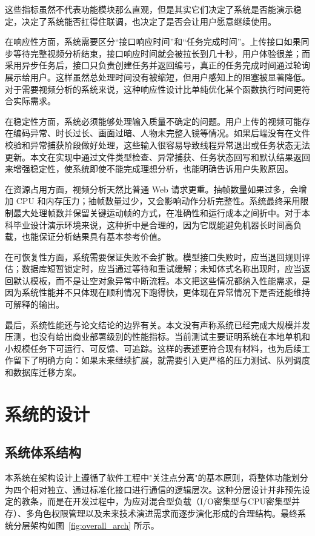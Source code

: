 这些指标虽然不代表功能模块那么直观，但是其实它们决定了系统是否能演示稳定，决定了系统能否扛得住联调，也决定了是否会让用户愿意继续使用。

在响应性方面，系统需要区分“接口响应时间”和“任务完成时间”。上传接口如果同步等待完整视频分析结束，接口响应时间就会被拉长到几十秒，用户体验很差；而采用异步任务后，接口只负责创建任务并返回编号，真正的任务完成时间通过轮询展示给用户。这样虽然总处理时间没有被缩短，但用户感知上的阻塞被显著降低。对于需要视频分析的系统来说，这种响应性设计比单纯优化某个函数执行时间更符合实际需求。

在稳定性方面，系统必须能够处理输入质量不确定的问题。用户上传的视频可能存在编码异常、时长过长、画面过暗、人物未完整入镜等情况。如果后端没有在文件校验和异常捕获阶段做好处理，这些输入很容易导致线程异常退出或任务状态无法更新。本文在实现中通过文件类型检查、异常捕获、任务状态回写和默认结果返回来增强稳定性，使系统即使不能完成理想分析，也能明确告诉用户失败原因。

在资源占用方面，视频分析天然比普通 Web 请求更重。抽帧数量如果过多，会增加 CPU 和内存压力；抽帧数量过少，又会影响动作分析完整性。系统最终采用限制最大处理帧数并保留关键运动帧的方式，在准确性和运行成本之间折中。对于本科毕业设计演示环境来说，这种折中是合理的，因为它既能避免机器长时间高负载，也能保证分析结果具有基本参考价值。

在可恢复性方面，系统需要保证失败不会扩散。模型接口失败时，应当退回规则评估；数据库短暂锁定时，应当通过等待和重试缓解；未知体式名称出现时，应当返回默认模板，而不是让空对象异常中断流程。本文把这些情况都纳入性能需求，是因为系统性能并不只体现在顺利情况下跑得快，更体现在异常情况下是否还能维持可解释的输出。

最后，系统性能还与论文结论的边界有关。本文没有声称系统已经完成大规模并发压测，也没有给出商业部署级别的性能指标。当前测试主要证明系统在本地单机和小规模任务下可运行、可反馈、可追踪。这样的表述更符合现有材料，也为后续工作留下了明确方向：如果未来继续扩展，就需要引入更严格的压力测试、队列调度和数据库迁移方案。

\chapter{系统的设计}
\section{系统体系结构}

本系统在架构设计上遵循了软件工程中"关注点分离"的基本原则，将整体功能划分为四个相对独立、通过标准化接口进行通信的逻辑层次。这种分层设计并非预先设定的教条，而是在开发过程中，为应对混合型负载（I/O密集型与CPU密集型并存）、多角色权限管理以及未来技术演进需求而逐步演化形成的合理结构。最终系统分层架构如图~\ref{fig:overall_arch} 所示。

